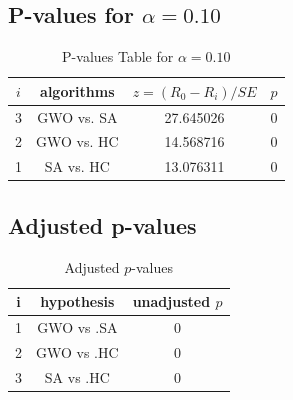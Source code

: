 \documentclass[a4paper,10pt]{article}
\begin{document}
\begin{landscape}
\subsection{P-values for $\alpha=0.10$}

\begin{table}[!htp]
\centering\scriptsize
\begin{tabular}{cccc}
$i$&algorithms&$z=(R_0 - R_i)/SE$&$p$\\
\hline3&GWO vs. SA&27.645026&0\\
2&GWO vs. HC&14.568716&0\\
1&SA vs. HC&13.076311&0\\
\hline
\end{tabular}
\caption{P-values Table for $\alpha=0.10$}
\end{table}\pagebreak

\subsection{Adjusted p-values}

\begin{table}[!htp]
\centering\scriptsize
\begin{tabular}{ccc}
i&hypothesis&unadjusted $p$\\
\hline1&GWO vs .SA&0\\
2&GWO vs .HC&0\\
3&SA vs .HC&0\\
\hline
\end{tabular}
\caption{Adjusted $p$-values}
\end{table}

\end{landscape}
\end{document}
